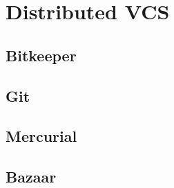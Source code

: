 \documentclass{beamer}
\begin{document}
\section{Distributed VCS}
\subsection{Bitkeeper}
\subsection{Git}
\subsection{Mercurial}
\subsection{Bazaar}
\end{document}
